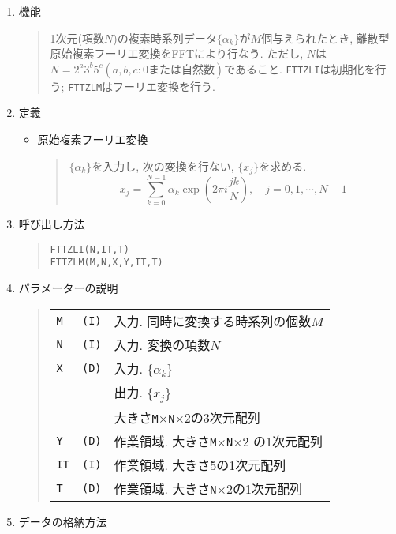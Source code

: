 \documentclass[a4j]{jarticle}
\newcommand{\ttM}{{\tt M}}
\newcommand{\ttN}{{\tt N}}
\begin{document}
\begin{enumerate}
  \item 機能 
  \begin{quote}
    1次元(項数$N$)の複素時系列データ$\{\alpha_k\}$が$M$個与えられたとき, 
    離散型原始複素フーリエ変換をFFTにより行なう. ただし, 
    $N$は$N=2^a3^b5^c(a,b,c: 0または自然数)$であること. 
     {\tt FTTZLI}は初期化を行う;
     {\tt FTTZLM}はフーリエ変換を行う.

  \end{quote}
  \item 定義
    \begin{itemize}
     \item 原始複素フーリエ変換
      \begin{quote}
       $\{\alpha_k\}$を入力し, 次の変換を行ない, $\{x_j\}$を求める. 
       $$x_j=\sum^{N-1}_{k=0}\alpha_k\exp(2\pi i\frac{jk}N),
       \quad j=0,1,\cdots,N-1$$
      \end{quote}
     \end{itemize}    
  \item 呼び出し方法 
  \begin{quote}
    {\tt FTTZLI(N,IT,T)}\\
    {\tt FTTZLM(M,N,X,Y,IT,T)}
  \end{quote}
  \item パラメーターの説明 
  \begin{quote}
    \begin{tabular}{llp{10cm}}
      {\tt M }   & {\tt (I)} & 入力. 同時に変換する時系列の個数$M$\\
      {\tt N }   & {\tt (I)} & 入力. 変換の項数$N$\\
      {\tt X }   & {\tt (D)} & 入力. $\{\alpha_k\}$\\
                 &           & 出力. $\{x_j\}$\\
                 &           & 大きさ\ttM$\times$\ttN$\times$2の3次元配列\\
      {\tt Y }   & {\tt (D)} & 作業領域. 大きさ\ttM$\times$\ttN$\times$2
                               の1次元配列\\
      {\tt IT}   & {\tt (I)} & 作業領域. 大きさ5の1次元配列\\
      {\tt T }   & {\tt (D)} & 作業領域. 大きさ\ttN$\times$2の1次元配列
    \end{tabular}
  \end{quote}

  \item データの格納方法


\end{enumerate}
\end{document}
